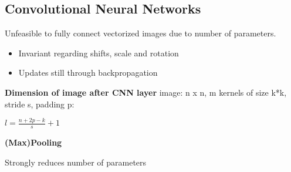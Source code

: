\subsection{Convolutional Neural Networks}

Unfeasible to fully connect vectorized images due to number of parameters.

\begin{itemize}
    \item Invariant regarding shifts, scale and rotation
    \item Updates still through backpropagation
\end{itemize}

\textbf{Dimension of image after CNN layer}
image: n x n, m kernels of size k*k, stride s, padding p:

\begin{center}
    $l = \frac{n + 2p -k}{s} + 1$
\end{center}

\textbf{(Max)Pooling}

Strongly reduces number of parameters

